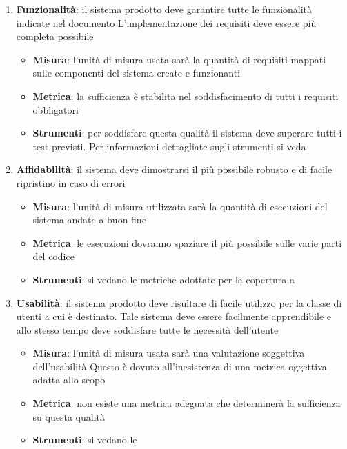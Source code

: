 {  \begin{enumerate}
  \item \textbf{Funzionalità}: il sistema prodotto deve garantire tutte
    le funzionalità indicate nel documento \emph{\analisideirequisiti} L'implementazione dei requisiti deve essere più completa
    possibile

    \begin{itemize}
    \item \textbf{Misura}: l'unità di misura usata sarà la quantità di requisiti mappati sulle componenti del sistema create e funzionanti
    \item \textbf{Metrica}: la sufficienza è stabilita nel soddisfacimento di tutti i requisiti obbligatori
    \item \textbf{Strumenti}: per soddisfare questa qualità il sistema deve superare tutti i test previsti.
      Per informazioni dettagliate sugli strumenti si veda  \emph{\normediprogetto}
    \end{itemize}

  \item \textbf{Affidabilità}: il sistema deve dimostrarsi il più possibile robusto e di facile ripristino in caso di errori

    \begin{itemize}
    \item \textbf{Misura}: l’unità di misura utilizzata sarà la quantità di esecuzioni del sistema andate a buon fine
    \item \textbf{Metrica}: le esecuzioni dovranno spaziare il più
      possibile sulle varie parti del codice
    \item \textbf{Strumenti}: si vedano le metriche adottate per la
      copertura a %
    \end{itemize}

  \item \textbf{Usabilità}: il sistema prodotto deve risultare di facile
    utilizzo per la classe di utenti a cui è destinato. Tale sistema
    deve essere facilmente apprendibile e allo stesso tempo deve
    soddisfare tutte le necessità dell'utente
    \begin{itemize}
    \item \textbf{Misura}: l'unità di misura usata sarà una valutazione soggettiva dell'usabilità Questo è dovuto all'inesistenza di una metrica oggettiva adatta allo scopo
    \item \textbf{Metrica}:  non esiste una metrica adeguata che determinerà la sufficienza su questa qualità
    \item \textbf{Strumenti}: si vedano le  \emph{\normediprogetto}
    \end{itemize}


\end{enumerate}}
